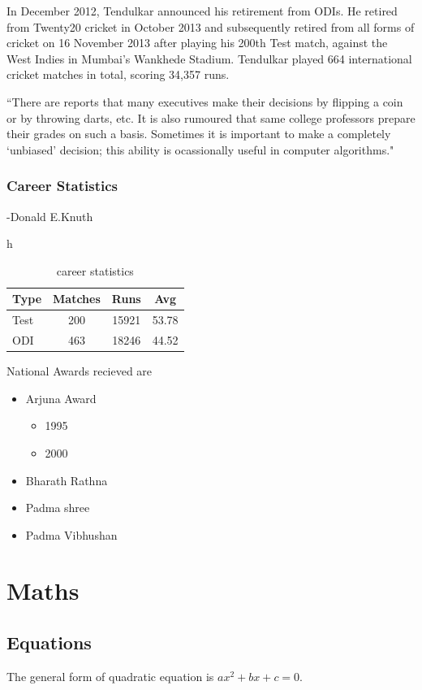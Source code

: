 \documentclass[a4paper,15pt]{report}
\begin{document}
In December 2012, Tendulkar announced his retirement from ODIs. He retired from Twenty20 cricket in October 2013 and subsequently retired from all forms of cricket on 16 November 2013 after playing his 200th Test match, against the West Indies in Mumbai's Wankhede Stadium. Tendulkar played 664 international cricket matches in total, scoring 34,357 runs.

``There are reports that many executives make their decisions by flipping a coin or by throwing darts, etc. It is also rumoured that same college professors prepare their grades on such a basis. Sometimes it is important to make a completely `unbiased' decision; this ability is ocassionally useful in computer algorithms."

\subsection{Career Statistics}																							\hfill-Donald E.Knuth
\begin{table}{h}
\centering
\begin{tabular}{l|c|c|c}
	\hline
	Type&Matches&Runs&Avg\\
	\hline
	Test&200&15921&53.78\\
	\hline
	ODI&463&18246&44.52\\
	\hline
\end{tabular}
\caption{career statistics}
\label{carstat}
\end{table}
National Awards recieved are
\begin{itemize}
	\item Arjuna Award
	\begin{itemize}
	  \item 1995
	  \item 2000
	 \end{itemize}
	\item Bharath Rathna
	\item Padma shree
	\item Padma Vibhushan
\end{itemize}
\chapter{Maths}
\section{Equations}
The general form of quadratic equation is $ax^2+bx+c=0$.
\end{document}
